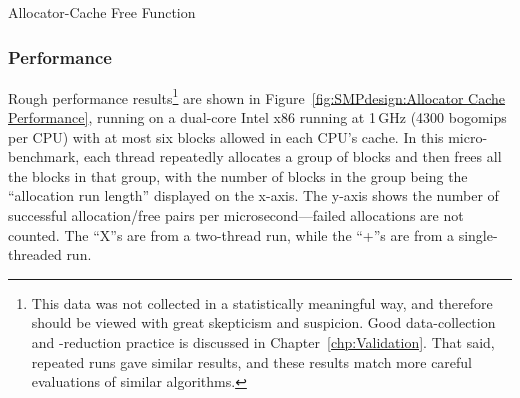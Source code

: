 \begin{listing}[tbp]

\caption{Allocator-Cache Free Function}
\label{lst:SMPdesign:Allocator-Cache Free Function}
\end{listing}

\QuickQuizEnd

\subsubsection{Performance}

Rough performance results\footnote{
	This data was not collected in a statistically meaningful way,
	and therefore should be viewed with great skepticism and suspicion.
	Good data-collection and -reduction practice is discussed
	in Chapter~\ref{chp:Validation}.
	That said, repeated runs gave similar results, and these results
	match more careful evaluations of similar algorithms.}
are shown in
Figure~\ref{fig:SMPdesign:Allocator Cache Performance},
running on a dual-core Intel x86 running at 1\,GHz (4300 bogomips per CPU)
with at most six blocks allowed in each CPU's cache.
In this micro-benchmark,
each thread repeatedly allocates a group of blocks and then frees all
the blocks in that group, with
the number of blocks in the group being the ``allocation run length''
displayed on the x-axis.
The y-axis shows the number of successful allocation/free pairs per
microsecond---failed allocations are not counted.
The ``X''s are from a two-thread run, while the ``+''s are from a
single-threaded run.

